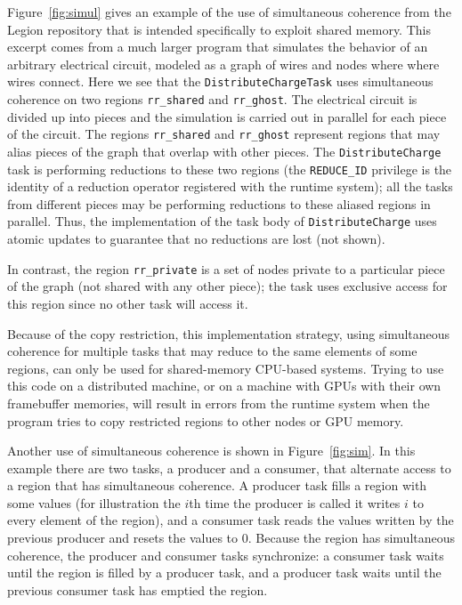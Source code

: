 Figure~\ref{fig:simul} gives an example of the use of simultaneous coherence from the Legion repository that is intended specifically to exploit shared memory.  This excerpt comes from a much larger
program that simulates the behavior of an arbitrary electrical circuit, modeled as a graph of wires and nodes where where wires connect.   Here we see that the
{\tt DistributeChargeTask} uses simultaneous coherence on two regions {\tt rr\_shared} and {\tt rr\_ghost}.  The electrical circuit is divided up into pieces
and the simulation is carried out in parallel for each piece of the circuit.  The regions {\tt rr\_shared} and {\tt rr\_ghost} represent regions that may alias pieces
of the graph that overlap with other pieces. The {\tt DistributeCharge} task is performing reductions to these two regions (the {\tt REDUCE\_ID} privilege is the identity
of a reduction operator registered with the runtime system); all the tasks from different pieces may be performing reductions to these aliased regions in parallel.
Thus, the implementation of the task body of {\tt DistributeCharge} uses atomic updates to guarantee that no reductions are lost (not shown).

In contrast, the region {\tt rr\_private} is a set of nodes private to a particular piece of the graph (not shared with any other piece);
the task uses exclusive access for this region since no other task will access it.

Because of the copy restriction, this implementation strategy, using simultaneous coherence for multiple tasks that may reduce to the same elements of some regions,
can only be used for shared-memory CPU-based systems.  Trying to use this code on a distributed machine, or on a machine with GPUs with their own framebuffer memories,
will result in errors from the runtime system when the program tries to copy restricted regions to other nodes or GPU memory.

Another use of simultaneous coherence is shown in Figure~\ref{fig:sim}.  In this example there are two tasks, a producer and a consumer, that alternate
access to a region that has simultaneous coherence.  A producer task fills a region with some values (for illustration the $i$th time the producer is called it writes $i$ to
every element of the region), and a consumer task reads the values written by the previous producer and resets the values to 0.  Because the region has simultaneous coherence, 
the producer and consumer tasks synchronize: a consumer task waits until the region is filled by a producer task, and a producer task waits until the previous consumer task has emptied
the region.


